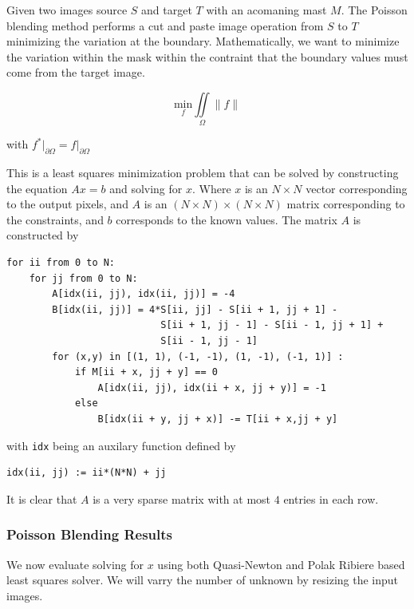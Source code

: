 \documentclass[]{article}
\begin{document}
Given two images source $S$ and target $T$ with an acomaning mast $M$.
The Poisson blending method performs a cut and paste image operation
from $S$ to $T$ minimizing the variation at the boundary.
Mathematically, we want to minimize the variation within the mask within
the contraint that the boundary values must come from the target image.

\[
\underset{f}{\text{min}} \iint \limits_\Omega \|  f \|
\]

with $f^* \lvert_{\partial \Omega} = f \lvert_{ \partial \Omega}$

This is a least squares minimization problem that can be solved by
constructing the equation $Ax = b$ and solving for $x$. Where $x$ is an
$N \times N$ vector corresponding to the output pixels, and $A$ is an
$(N \times N) \times (N \times N)$ matrix corresponding to the
constraints, and $b$ corresponds to the known values. The matrix $A$ is
constructed by

\begin{verbatim}
for ii from 0 to N:
    for jj from 0 to N:
        A[idx(ii, jj), idx(ii, jj)] = -4
        B[idx(ii, jj)] = 4*S[ii, jj] - S[ii + 1, jj + 1] -
                           S[ii + 1, jj - 1] - S[ii - 1, jj + 1] +
                           S[ii - 1, jj - 1]
        for (x,y) in [(1, 1), (-1, -1), (1, -1), (-1, 1)] :
            if M[ii + x, jj + y] == 0
                A[idx(ii, jj), idx(ii + x, jj + y)] = -1
            else
                B[idx(ii + y, jj + x)] -= T[ii + x,jj + y]
\end{verbatim}

with \texttt{idx} being an auxilary function defined by

\begin{verbatim}
idx(ii, jj) := ii*(N*N) + jj
\end{verbatim}

It is clear that $A$ is a very sparse matrix with at most $4$ entries in
each row.

\subsubsection{Poisson Blending Results}\label{poisson-blending-results}

We now evaluate solving for $x$ using both Quasi-Newton and Polak
Ribiere based least squares solver. We will varry the number of unknown
by resizing the input images.
\end{document}
